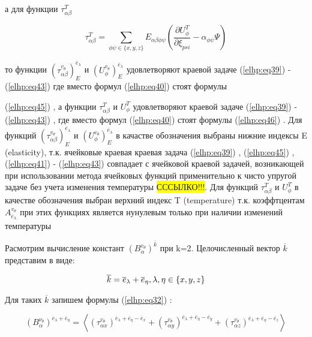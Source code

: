 а для функции 
$\tau_{ \alpha\beta}^T$

\begin{equation}
    \label{elhp:eq46}
    \tau_{ \alpha\beta}^T = \sum_{ \phi\psi \in \{x,y,z\}} E_{ \alpha\beta \phi\psi}
    \left( \frac{ \partial U_{\phi}^T}{ \partial \xi_{psi}} - \alpha_{ \phi\psi} \Psi \right) 
\end{equation}

то функции  
$\left( \tau_{ \alpha\beta}^{ v_{\theta}} \right)_E^{ \overline{e}_{\lambda}}$
и 
$\left( U_{ \phi}^{ v_{\theta}} \right)_E^{ \overline{e}_{\lambda}}$
удовлетворяют краевой задаче 
(\ref{elhp:eq39})
-
(\ref{elhp:eq43})
где вместо формул 
(\ref{elhp:eq40})
стоят формулы

(\ref{elhp:eq45})
, а функции 
$\tau_{ \alpha\beta}^T$
и
$U_{ \phi}^T$
удовлетворяют краевой задаче 
(\ref{elhp:eq39})
-
(\ref{elhp:eq43})
, где вместо формул 
(\ref{elhp:eq40})
стоят
формулы 
(\ref{elhp:eq46})
. Для функций 
$\left( \tau_{ \alpha\beta}^{ v_{\theta}} \right)_E^{ \overline{e}_{\lambda}}$
и 
$\left( U_{ \phi}^{ v_{\theta}} \right)_E^{ \overline{e}_{\lambda}}$
в качастве обозначения выбраны нижние индексы E (elasticity), т.к. ячейковые
краевая краевая задача 
(\ref{elhp:eq39})
, 
(\ref{elhp:eq45})
, 
(\ref{elhp:eq41})
-
(\ref{elhp:eq43})
совпадает с ячейковой краевой задачей, 
возникающей при использовании метода ячейковых функций применительно к чисто
упругой задаче без учета изменения температуры \colorbox{yellow}{СССЫЛКО!!!}. Для функций
$\tau_{ \alpha\beta}^T$
и
$U_{ \phi}^T$
в качестве обозначения выбран верхний индекс T (temperature) т.к. коэффтцентам 
$ {A}_{ \overline{e}_{\lambda}}^{ v_{\theta}} $
при этих функциях является нунулевым только при наличии изменений температуры

Расмотрим вычисление констант 
$ \left( B_{\alpha}^{ v_{\theta}} \right)^{ \overline{k}} $
при k=2. Целочисленный вектор 
$ \overline{k}$
представим в виде:

\begin{equation}
    \label{elhp:eq47}
    \overline{k} = \overline{e}_{\lambda} + \overline{e}_{\eta}, \\ \lambda,\eta \in \{x,y,z\}  
\end{equation}

Для таких 
$ \overline{k}$
запишем формулы 
(\ref{elhp:eq32})
:

\begin{equation}
    \label{elhp:eq48}
    \left( B_{\alpha}^{\nu_{\theta}} \right)^{ \overline{e}_{\lambda} + \overline{e}_{\eta}  } 
    =
    \left< 
    \left( \tau_{\alpha x}^{v_{\theta}} \right)^{\overline{e}_{\lambda} + \overline{e}_{\eta} - \overline{e}_x } 
    +
    \left( \tau_{\alpha y}^{v_{\theta}} \right)^{\overline{e}_{\lambda} + \overline{e}_{\eta} - \overline{e}_y } 
    +
    \left( \tau_{\alpha z}^{v_{\theta}} \right)^{\overline{e}_{\lambda} + \overline{e}_{\eta} - \overline{e}_z } 
    \right> 
\end{equation}

